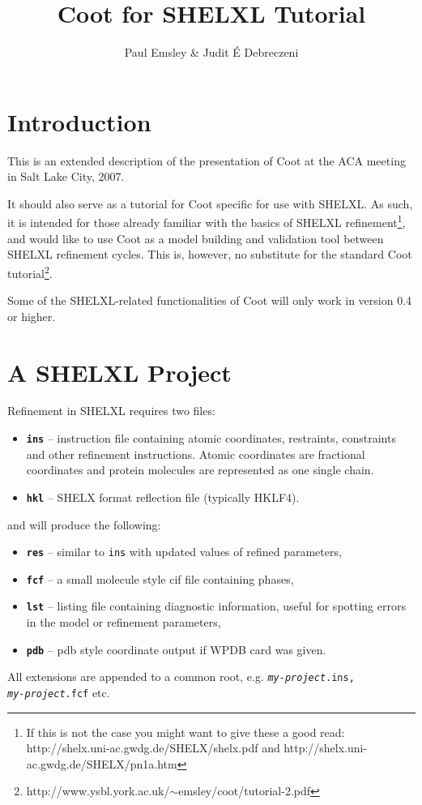 \documentclass{article}
\begin{document}
\title{Coot for SHELXL Tutorial}
\author{Paul Emsley \& Judit \'{E} Debreczeni}

\maketitle
\tableofcontents

\pagebreak
\section{Introduction}

This is an extended description of the presentation of Coot at the ACA
meeting in Salt Lake City, 2007.

It should also serve as a tutorial for Coot specific for use with
SHELXL. As such, it is intended for those already familiar with the
basics of SHELXL refinement\footnote{If this is not the case you might
  want to give these a good
  read:\\http://shelx.uni-ac.gwdg.de/SHELX/shelx.pdf and
  http://shelx.uni-ac.gwdg.de/SHELX/pn1a.htm}, and would like to use
Coot as a model building and validation tool between SHELXL refinement
cycles. This is, however, no substitute for the standard Coot
tutorial\footnote{http://www.ysbl.york.ac.uk/$\sim$emsley/coot/tutorial-2.pdf}.

Some of the SHELXL-related functionalities of Coot will only work in
version 0.4 or higher.

\section{A SHELXL Project}
Refinement in SHELXL requires two files:
\begin{itemize}
\item {\bf \texttt{ins}} -- instruction file containing atomic
  coordinates, restraints, constraints and other refinement
  instructions. Atomic coordinates are fractional coordinates and
  protein molecules are represented as one single chain.
\item {\bf \texttt{hkl}} -- SHELX format reflection file (typically HKLF4).
\end{itemize}
and will produce the following:
\begin{itemize}
\item {\bf \texttt{res}} -- similar to \texttt{ins} with updated
  values of refined parameters,
\item {\bf \texttt{fcf}} -- a small molecule style cif file containing
  phases,
\item {\bf \texttt{lst}} -- listing file containing diagnostic
  information, useful for spotting errors in the model or refinement
  parameters,
\item {\bf \texttt{pdb}} -- pdb style coordinate output if WPDB card was given.
\end{itemize}
All extensions are appended to a common root, e.g. \texttt{\emph{my-project}.ins,\\\emph{my-project}.fcf} etc.
\end{document}
